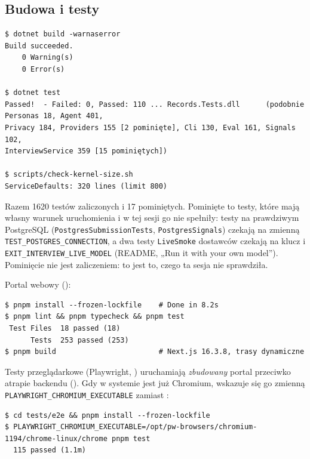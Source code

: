 {\subsection{Budowa i testy}

\begin{Verbatim}[fontsize=\scriptsize,frame=single,framesep=2mm]
$ dotnet build -warnaserror
Build succeeded.
    0 Warning(s)
    0 Error(s)

$ dotnet test
Passed!  - Failed: 0, Passed: 110 ... Records.Tests.dll      (podobnie Personas 18, Agent 401,
Privacy 184, Providers 155 [2 pominięte], Cli 130, Eval 161, Signals 102,
InterviewService 359 [15 pominiętych])

$ scripts/check-kernel-size.sh
ServiceDefaults: 320 lines (limit 800)
\end{Verbatim}

Razem 1620 testów zaliczonych i 17 pominiętych. Pominięte to testy, które mają
własny warunek uruchomienia i w tej sesji go nie spełniły: testy na prawdziwym
PostgreSQL (\texttt{PostgresSubmissionTests}, \texttt{PostgresSignals}) czekają
na zmienną \texttt{TEST\_\allowbreak{}POSTGRES\_\allowbreak{}CONNECTION}, a dwa testy
\texttt{LiveSmoke} dostawców czekają na klucz i
\texttt{EXIT\_\allowbreak{}INTERVIEW\_\allowbreak{}LIVE\_\allowbreak{}MODEL} (README, „Run it with your own model”).
Pominięcie nie jest zaliczeniem: to jest to, czego ta sesja nie sprawdziła.

Portal webowy ():

\begin{Verbatim}[fontsize=\scriptsize,frame=single,framesep=2mm]
$ pnpm install --frozen-lockfile    # Done in 8.2s
$ pnpm lint && pnpm typecheck && pnpm test
 Test Files  18 passed (18)
      Tests  253 passed (253)
$ pnpm build                        # Next.js 16.3.8, trasy dynamiczne
\end{Verbatim}

Testy przeglądarkowe (Playwright, ) uruchamiają
\emph{zbudowany} portal przeciwko atrapie backendu
(). Gdy w systemie jest już
Chromium, wskazuje się go zmienną \texttt{PLAYWRIGHT\_\allowbreak{}CHROMIUM\_\allowbreak{}EXECUTABLE}
zamiast :

\begin{Verbatim}[fontsize=\scriptsize,frame=single,framesep=2mm]
$ cd tests/e2e && pnpm install --frozen-lockfile
$ PLAYWRIGHT_CHROMIUM_EXECUTABLE=/opt/pw-browsers/chromium-1194/chrome-linux/chrome pnpm test
  115 passed (1.1m)
\end{Verbatim}

}
